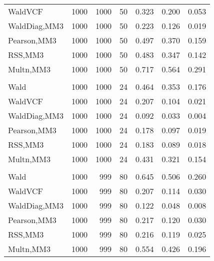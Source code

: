 \documentclass[
]{article}
\begin{document}
\begin{table}[H]
{\begin{tabular}[t]{lrrrrrr}
\hspace{1em}WaldVCF & 1000 & 1000 & 50 & 0.323 & 0.200 & 0.053\\
\hspace{1em}WaldDiag,MM3 & 1000 & 1000 & 50 & 0.223 & 0.126 & 0.019\\
\hspace{1em}Pearson,MM3 & 1000 & 1000 & 50 & 0.497 & 0.370 & 0.159\\
\hspace{1em}RSS,MM3 & 1000 & 1000 & 50 & 0.483 & 0.347 & 0.142\\
\hspace{1em}Multn,MM3 & 1000 & 1000 & 50 & 0.717 & 0.564 & 0.291\\
\addlinespace[0.3em]
\multicolumn{7}{l}{\textbf{2F 10V}}\\
\hspace{1em}Wald & 1000 & 1000 & 24 & 0.464 & 0.353 & 0.176\\
\hspace{1em}WaldVCF & 1000 & 1000 & 24 & 0.207 & 0.104 & 0.021\\
\hspace{1em}WaldDiag,MM3 & 1000 & 1000 & 24 & 0.092 & 0.033 & 0.004\\
\hspace{1em}Pearson,MM3 & 1000 & 1000 & 24 & 0.178 & 0.097 & 0.019\\
\hspace{1em}RSS,MM3 & 1000 & 1000 & 24 & 0.183 & 0.089 & 0.018\\
\hspace{1em}Multn,MM3 & 1000 & 1000 & 24 & 0.431 & 0.321 & 0.154\\
\addlinespace[0.3em]
\multicolumn{7}{l}{\textbf{3F 15V}}\\
\hspace{1em}Wald & 1000 & 999 & 80 & 0.645 & 0.506 & 0.260\\
\hspace{1em}WaldVCF & 1000 & 999 & 80 & 0.207 & 0.114 & 0.030\\
\hspace{1em}WaldDiag,MM3 & 1000 & 999 & 80 & 0.122 & 0.048 & 0.008\\
\hspace{1em}Pearson,MM3 & 1000 & 999 & 80 & 0.217 & 0.120 & 0.030\\
\hspace{1em}RSS,MM3 & 1000 & 999 & 80 & 0.216 & 0.119 & 0.025\\
\hspace{1em}Multn,MM3 & 1000 & 999 & 80 & 0.554 & 0.426 & 0.196\\
\bottomrule
\end{tabular}}
\endgroup{}
\end{table}
\end{document}
